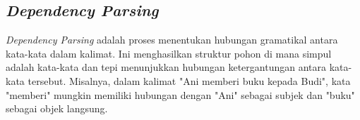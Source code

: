 \subsection{\textit{Dependency Parsing}}

\textit{Dependency Parsing} adalah proses menentukan hubungan gramatikal antara kata-kata dalam kalimat. Ini menghasilkan struktur pohon di mana simpul adalah kata-kata dan tepi menunjukkan hubungan ketergantungan antara kata-kata tersebut. Misalnya, dalam kalimat "Ani memberi buku kepada Budi", kata "memberi" mungkin memiliki hubungan dengan "Ani" sebagai subjek dan "buku" sebagai objek langsung.